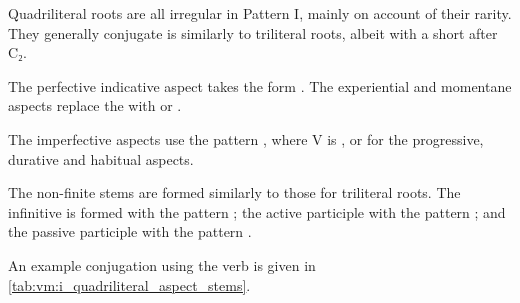 \documentclass[grammar]{subfiles}
\begin{document}
Quadriliteral roots are all irregular in Pattern I, mainly on account of their
rarity.  They generally conjugate is similarly to triliteral roots, albeit with
a short  after C₂.

The perfective indicative aspect takes the form . The
experiential and momentane aspects replace the  with  or .

The imperfective aspects use the pattern , where V is
,  or  for the progressive, durative and habitual aspects.

The non-finite stems are formed similarly to those for triliteral roots.  The
infinitive is formed with the pattern ; the active participle
with the pattern ; and the passive participle with the pattern
.

An example conjugation using the verb  is given in
\cref{tab:vm:i_quadriliteral_aspect_stems}. 

\begin{table}[h!]\small\capstart
  \centering
  \\
  \caption{Pattern I quadriliteral stems\label{tab:vm:i_quadriliteral_aspect_stems}}
\end{table}
\end{document}
